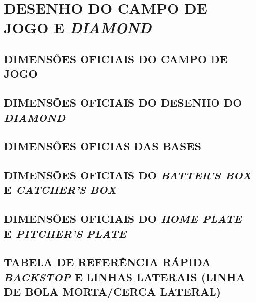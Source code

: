 \appendix
	\renewcommand{\thechapter}{ANEXO~\arabic{chapter}}
	\renewcommand{\thesection}{\Alph{section}}
	\renewcommand{\thesubsection}{\Alph{subsection}}


\chapter{DESENHO DO CAMPO DE JOGO E \textit{DIAMOND}}
\minitoc%


\section{DIMENSÕES OFICIAIS DO CAMPO DE JOGO}

\section{DIMENSÕES OFICIAIS DO DESENHO DO \textit{DIAMOND}}

\section{DIMENSÕES OFICIAS DAS BASES}

\section{DIMENSÕES OFICIAIS DO \textit{BATTER'S BOX} E \textit{CATCHER'S BOX}}

\section{DIMENSÕES OFICIAIS DO \textit{HOME PLATE} E \textit{PITCHER'S PLATE}}

\section{TABELA DE REFERÊNCIA RÁPIDA \textit{BACKSTOP} E LINHAS LATERAIS (LINHA DE BOLA MORTA/CERCA LATERAL)}

